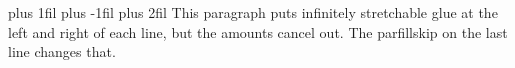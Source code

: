 \begin{minipage}{5cm}
\leftskip=0pt plus 1fil \rightskip=0pt plus -1fil
\parfillskip=0pt plus 2fil
This paragraph puts infinitely stretchable glue at
the left and right of each line, but the amounts cancel out.
The parfillskip on the last line changes that.
\end{minipage}
